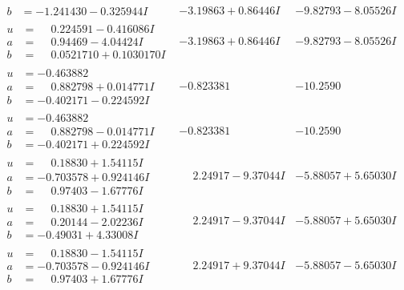 \documentclass[1p]{elsarticle_modified}
\theoremstyle{definition}
\begin{document}
$$\begin{array}{c|c|c}
\begin{aligned}
b &= -1.241430 - 0.325944 I\end{aligned}
 & -3.19863 + 0.86446 I & -9.82793 - 8.05526 I \\ \hline\begin{aligned}
u &= \phantom{-}0.224591 - 0.416086 I \\
a &= \phantom{-}0.94469 - 4.04424 I \\
b &= \phantom{-}0.0521710 + 0.1030170 I\end{aligned}
 & -3.19863 + 0.86446 I & -9.82793 - 8.05526 I \\ \hline\begin{aligned}
u &= -0.463882\phantom{ +0.000000I} \\
a &= \phantom{-}0.882798 + 0.014771 I \\
b &= -0.402171 - 0.224592 I\end{aligned}
 & -0.823381\phantom{ +0.000000I} & -10.2590\phantom{ +0.000000I} \\ \hline\begin{aligned}
u &= -0.463882\phantom{ +0.000000I} \\
a &= \phantom{-}0.882798 - 0.014771 I \\
b &= -0.402171 + 0.224592 I\end{aligned}
 & -0.823381\phantom{ +0.000000I} & -10.2590\phantom{ +0.000000I} \\ \hline\begin{aligned}
u &= \phantom{-}0.18830 + 1.54115 I \\
a &= -0.703578 + 0.924146 I \\
b &= \phantom{-}0.97403 - 1.67776 I\end{aligned}
 & \phantom{-}2.24917 - 9.37044 I & -5.88057 + 5.65030 I \\ \hline\begin{aligned}
u &= \phantom{-}0.18830 + 1.54115 I \\
a &= \phantom{-}0.20144 - 2.02236 I \\
b &= -0.49031 + 4.33008 I\end{aligned}
 & \phantom{-}2.24917 - 9.37044 I & -5.88057 + 5.65030 I \\ \hline\begin{aligned}
u &= \phantom{-}0.18830 - 1.54115 I \\
a &= -0.703578 - 0.924146 I \\
b &= \phantom{-}0.97403 + 1.67776 I\end{aligned}
 & \phantom{-}2.24917 + 9.37044 I & -5.88057 - 5.65030 I \\ \hline\begin{aligned}

\end{aligned}
\end{array}$$
\end{document}
